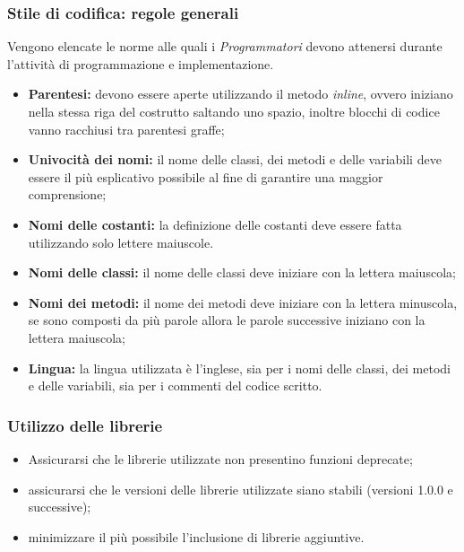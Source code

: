 \subsubsection{Stile di codifica: regole generali} 
Vengono elencate le norme alle quali i \textit{Programmatori} devono attenersi durante l'attività di programmazione e implementazione.
\begin{itemize}
	\item \textbf{Parentesi:} devono essere aperte utilizzando il metodo \textit{inline}, ovvero iniziano nella stessa riga del costrutto saltando uno spazio, inoltre blocchi di codice vanno racchiusi tra parentesi graffe;
	\item \textbf{Univocità dei nomi:} il nome delle classi, dei metodi e delle variabili deve essere il più esplicativo possibile al fine di garantire una maggior comprensione;
	\item \textbf{Nomi delle costanti:} la definizione delle costanti deve essere fatta utilizzando solo lettere maiuscole.
	\item \textbf{Nomi delle classi:} il nome delle classi deve iniziare con la lettera maiuscola;
	\item \textbf{Nomi dei metodi:} il nome dei metodi deve iniziare con la lettera minuscola, se sono composti da più parole allora le parole successive iniziano con la lettera maiuscola;
	\item \textbf{Lingua:} la lingua utilizzata è l'inglese, sia per i nomi delle classi, dei metodi e delle variabili, sia per i commenti del codice scritto.
\end{itemize}

\subsubsection{Utilizzo delle librerie}
\begin{itemize}
	\item Assicurarsi che le librerie utilizzate non presentino funzioni deprecate;
	\item assicurarsi che le versioni delle librerie utilizzate siano stabili (versioni 1.0.0 e successive);
	\item minimizzare il più possibile l'inclusione di librerie aggiuntive.
\end{itemize}

